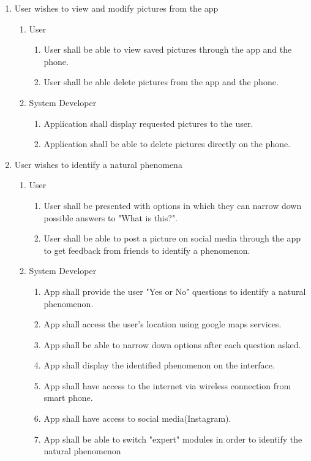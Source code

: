 \documentclass[]{article}
\begin{document}
\begin{enumerate}[{BE}1.]
\begin{enumerate}[{VP2}.1]
	\end{enumerate}
	\item User wishes to view and modify pictures from the app
	\begin{enumerate} [{VP3}.1]
		\item User
			\begin{enumerate}
				\item User shall be able to view saved pictures through the app and the phone.
				\item User shall be able delete pictures from the app and the phone.
			\end{enumerate}
		\item System Developer
			\begin{enumerate}
				\item Application shall display requested pictures to the user.
				\item Application shall be able to delete pictures directly on the phone.
			\end{enumerate}
	\end{enumerate}
	\item User wishes to identify a natural phenomena
	\begin{enumerate}[{VP4}.1]
		\item User
			\begin{enumerate}
				\item User shall be presented with options in which they can narrow down possible answers to "What is this?".
				\item User shall be able to post a picture on social media through the app to get feedback from friends to identify a phenomenon.
								
			\end{enumerate}
		\item System Developer
			\begin{enumerate}
				\item App shall provide the user "Yes or No" questions to identify a natural phenomenon.
				\item App shall access the user's location using google maps services.
				\item App shall be able to narrow down options after each question asked. 
				\item App shall display the identified phenomenon on the interface.
				\item App shall have access to the internet via wireless connection from smart phone.
				\item App shall have access to social media(Instagram). 
				\item App shall be able to switch "expert" modules in order to identify the natural phenomenon
				
			\end{enumerate}
	\end{enumerate}
\end{enumerate}
\end{document}
